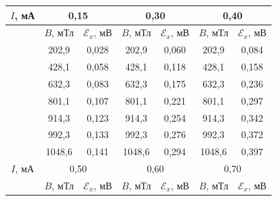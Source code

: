 \documentclass[a4paper,12pt]{article} %
\begin{document}
\begin{longtable}[c]{c|cc|cc|cc|}
	\hline
	\multicolumn{1}{|c|}{$I$, мА} & \multicolumn{2}{c|}{0,15}                          & \multicolumn{2}{c|}{0,30}                          & \multicolumn{2}{c|}{0,40}                          \\ \hline
	\endfirsthead
	\endhead
	& \multicolumn{1}{c|}{$B$, мТл} & $\mathcal{E}_x$, мВ & \multicolumn{1}{c|}{$B$, мТл} & $\mathcal{E}_x$, мВ & \multicolumn{1}{c|}{$B$, мТл} & $\mathcal{E}_x$, мВ \\ \cline{2-7} 
	& \multicolumn{1}{c|}{202,9}   & 0,028               & \multicolumn{1}{c|}{202,9}   & 0,060               & \multicolumn{1}{c|}{202,9}   & 0,084               \\ \cline{2-7} 
	& \multicolumn{1}{c|}{428,1}   & 0,058               & \multicolumn{1}{c|}{428,1}   & 0,118               & \multicolumn{1}{c|}{428,1}   & 0,158               \\ \cline{2-7} 
	& \multicolumn{1}{c|}{632,3}   & 0,083               & \multicolumn{1}{c|}{632,3}   & 0,175               & \multicolumn{1}{c|}{632,3}   & 0,236               \\ \cline{2-7} 
	& \multicolumn{1}{c|}{801,1}   & 0,107               & \multicolumn{1}{c|}{801,1}   & 0,221               & \multicolumn{1}{c|}{801,1}   & 0,297               \\ \cline{2-7} 
	& \multicolumn{1}{c|}{914,3}   & 0,123               & \multicolumn{1}{c|}{914,3}   & 0,254               & \multicolumn{1}{c|}{914,3}   & 0,342               \\ \cline{2-7} 
	& \multicolumn{1}{c|}{992,3}   & 0,133               & \multicolumn{1}{c|}{992,3}   & 0,276               & \multicolumn{1}{c|}{992,3}   & 0,372               \\ \cline{2-7} 
	& \multicolumn{1}{c|}{1048,6}  & 0,141               & \multicolumn{1}{c|}{1048,6}  & 0,294               & \multicolumn{1}{c|}{1048,6}  & 0,397               \\ \hline
	\multicolumn{1}{|c|}{$I$, мА} & \multicolumn{2}{c|}{0,50}                          & \multicolumn{2}{c|}{0,60}                          & \multicolumn{2}{c|}{0,70}                          \\ \hline
	& \multicolumn{1}{c|}{$B$, мТл} & $\mathcal{E}_x$, мВ & \multicolumn{1}{c|}{$B$, мТл} & $\mathcal{E}_x$, мВ & \multicolumn{1}{c|}{$B$, мТл} & $\mathcal{E}_x$, мВ \\ \cline{2-7} 

\end{longtable}
\end{document}
